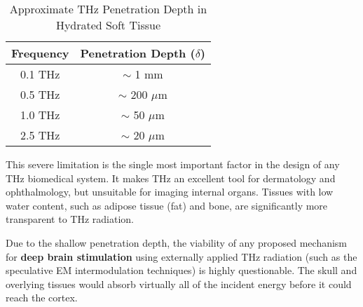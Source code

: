 \begin{table}[H]
    \centering
    \caption{Approximate THz Penetration Depth in Hydrated Soft Tissue}
    \label{tab:thz-penetration}
    \begin{tabular}{@{}cc@{}}
        \toprule
        \tableheaderfont Frequency & \tableheaderfont Penetration Depth ($\delta$) \\
        \midrule
        0.1 THz & $\sim$ 1 mm \\
        0.5 THz & $\sim$ 200 $\mu$m \\
        1.0 THz & $\sim$ 50 $\mu$m \\
        2.5 THz & $\sim$ 20 $\mu$m \\
        \bottomrule
    \end{tabular}
\end{table}

This severe limitation is the single most important factor in the design of any THz biomedical system. It makes THz an excellent tool for dermatology and ophthalmology, but unsuitable for imaging internal organs. Tissues with low water content, such as adipose tissue (fat) and bone, are significantly more transparent to THz radiation.

\begin{warningbox}
    Due to the shallow penetration depth, the viability of any proposed mechanism for \textbf{deep brain stimulation} using externally applied THz radiation (such as the speculative EM intermodulation techniques) is highly questionable. The skull and overlying tissues would absorb virtually all of the incident energy before it could reach the cortex.
\end{warningbox}


